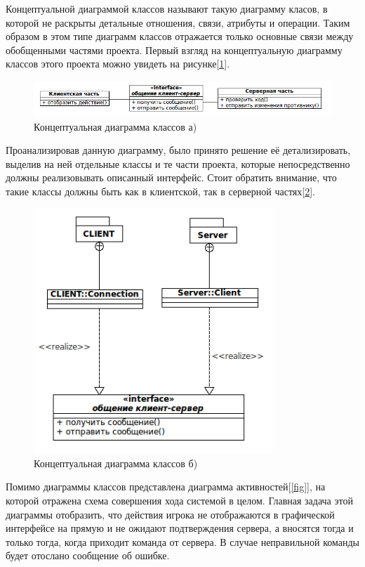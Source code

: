 Концептуальной диаграммой классов называют такую диаграмму класов, в которой не раскрыты детальные отношения, связи, атрибуты и операции. Таким образом в этом типе диаграмм классов отражается только основные связи между обобщенными частями проекта. Первый взгляд на концептуальную диаграмму классов этого проекта можно увидеть на рисунке[\ref{fig1}].

\begin{figure}[ht]
\centering
\includegraphics[width=17cm]{images/class.png}
\caption{Концептуальная диаграмма классов а)}
\label{fig1}
\end{figure}

Проанализировав данную диаграмму, было принято решение её детализировать, выделив на ней отдельные классы и те части проекта, которые непосредственно должны реализовывать описанный интерфейс. Стоит обратить внимание, что такие классы должны быть как в клиентской, так в серверной частях[\ref{fig2}].

\begin{figure}[ht]
\centering
\includegraphics[width=9cm]{images/class1.png}
\caption{Концептуальная диаграмма классов б)}
\label{fig2}
\end{figure}

Помимо диаграммы классов представлена диаграмма активностей[\ref{fig}], на которой отражена схема совершения хода системой в целом. Главная задача этой диаграммы отобразить, что действия игрока не отображаются в графической интерфейсе на прямую и не ожидают подтверждения сервера, а вносятся тогда и только тогда, когда приходит команда от сервера. В случае неправильной команды будет отослано сообщение об ошибке. 

